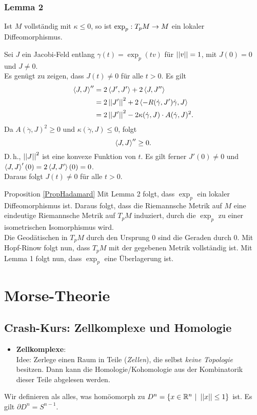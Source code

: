 
\subsection{Lemma 2}
Ist $M$ vollständig mit $\kappa \leq 0$, so ist $\exp_p : T_pM \overset{}{\rightarrow} M$ ein lokaler Diffeomorphismus.
\begin{Beweis}{}
Sei $J$ ein Jacobi-Feld entlang $\gamma(t) = \exp_p(tv)$ für $\left|\left|v\right|\right| = 1$, mit $J(0) = 0$ und $J\neq 0$.\\
Es genügt zu zeigen, dass $J(t) \neq 0$ für alle $t > 0$. Es gilt
\begin{align*}
\left<J,J\right>'' &= 2 \left<J', J'\right> + 2 \left<J, J''\right>\\
&= 2 \left|\left|J'\right|\right|^2 + 2 \left<-R(\dot{\gamma}, J')\dot{\gamma}, J\right>\\
&= 2\left|\left|J'\right|\right|^2 - 2 \kappa(\dot{\gamma}, J) \cdot A(\dot{\gamma}, J)^2.
\end{align*}
Da $A(\dot{\gamma}, J)^2 \geq 0$ und $\kappa(\dot{\gamma}, J) \leq 0$, folgt
\[ \left<J,J\right>'' \geq 0. \]
D.\,h., $\left|\left|J\right|\right|^2$ ist eine konvexe Funktion von $t$. Es gilt ferner $J'(0) \neq 0$ und $\left<J,J\right>'(0) = 2 \left<J,J'\right>(0) = 0$.\\
Daraus folgt $J(t) \neq 0$ für alle $t > 0$.
\end{Beweis}

\begin{Beweis}{Proposition \ref{PropHadamard}}
Mit Lemma 2 folgt, dass $\exp_{p}$ ein lokaler Diffeomorphismus ist. Daraus folgt, dass die Riemannsche Metrik auf $M$ eine eindeutige Riemannsche Metrik auf $T_pM$ induziert, durch die $\exp_{p}$ zu einer isometrischen Isomorphismus wird.\\
Die Geodätischen in $T_pM$ durch den Ursprung 0 sind die Geraden durch 0. Mit Hopf-Rinow folgt nun, dass $T_pM$ mit der gegebenen Metrik vollständig ist. Mit Lemma 1 folgt nun, dass $\exp_p$ eine Überlagerung ist.
\end{Beweis}




\chapter{Morse-Theorie}
\section{Crash-Kurs: Zellkomplexe und Homologie}
\begin{itemize}
	\item \textbf{Zellkomplexe}:\\
	Idee: Zerlege einen Raum in Teile (\emph{Zellen}), die selbst \emph{keine Topologie} besitzen. Dann kann die Homologie/Kohomologie aus der Kombinatorik dieser Teile abgelesen werden.
\end{itemize}
Wir definieren  als alles, was homöomorph zu $D^n = \set{x \in \R^n}{\norm{x} \leq 1}$ ist. Es gilt $\partial D^n = S^{n-1}$.
